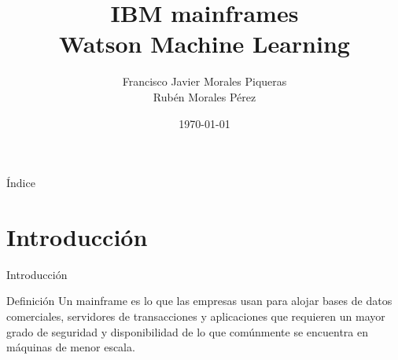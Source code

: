 \documentclass[compress]{beamer}
\title{IBM mainframes \\ Watson Machine Learning}
\author{Francisco Javier Morales Piqueras \\ Rubén Morales Pérez}
\date{\today}
\begin{document}
\begin{frame}
\titlepage
\end{frame}
\begin{frame}{Índice}
	\hypertarget{index}{}
	\tableofcontents
\end{frame}

\section{Introducción}
\begin{frame}{Introducción}
	\begin{block}{Definición}
		Un mainframe es lo que las empresas usan para alojar bases de datos comerciales, servidores de transacciones y aplicaciones que requieren un mayor grado de seguridad y disponibilidad de lo que comúnmente se encuentra en máquinas de menor escala.
	\end{block}


\end{frame}
\end{document}
